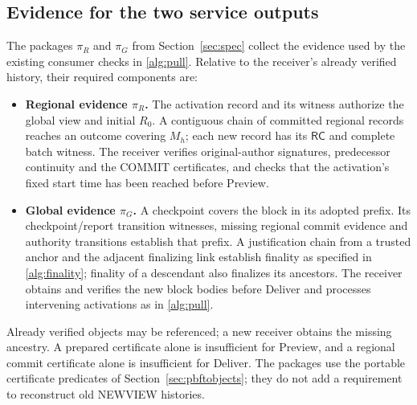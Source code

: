 \documentclass[11pt,a4paper,onecolumn]{article}
\newcommand{\RC}{\mathsf{RC}}
\theoremstyle{remark}\newtheorem{example}[definition]{Example}
\begin{document}
\subsection{Evidence for the two service outputs}\label{sec:consumerproofs}
The packages $\pi_R$ and $\pi_G$ from Section~\ref{sec:spec} collect the evidence
used by the existing consumer checks in \cref{alg:pull}. Relative to the
receiver's already verified history, their required components are:
\begin{itemize}
\item \textbf{Regional evidence $\pi_R$.} The activation record and its witness
authorize the global view and initial $R_0$. A contiguous chain of committed
regional records reaches an outcome covering $M_h$; each new record has its
$\RC$ and complete batch witness. The receiver verifies original-author
signatures, predecessor continuity and the COMMIT certificates, and checks
that the activation's fixed start time has been reached before Preview.
\item \textbf{Global evidence $\pi_G$.} A checkpoint covers the block in its
adopted prefix. Its checkpoint/report transition witnesses, missing regional
commit evidence and authority transitions establish that prefix. A
justification chain from a trusted anchor and the adjacent finalizing link
establish finality as specified in \cref{alg:finality}; finality of a descendant
also finalizes its ancestors. The receiver obtains and verifies the new block
bodies before Deliver and processes intervening activations as in
\cref{alg:pull}.
\end{itemize}
Already verified objects may be referenced; a new receiver obtains the missing
ancestry. A prepared certificate alone is insufficient for Preview, and a
regional commit certificate alone is insufficient for Deliver. The packages
use the portable certificate predicates of Section~\ref{sec:pbftobjects};
they do not add a requirement to reconstruct old NEWVIEW histories.
\end{document}
